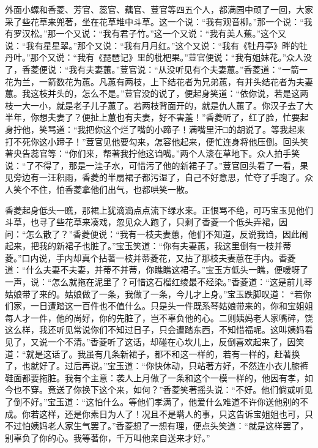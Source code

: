 \begin{parag}
    外面小螺和香菱、芳官、蕊官、藕官、荳官等四五个人，都满园中顽了一回，大家采了些花草来兜著，坐在花草堆中斗草。这一个说：“我有观音柳。”那一个说：“我有罗汉松。”那一个又说：“我有君子竹。”这一个又说：“我有美人蕉。”这个又说：“我有星星翠。”那个又说：“我有月月红。”这个又说：“我有《牡丹亭》畔的牡丹叶。”那个又说：“我有《琵琶记》里的枇杷果。”荳官便说：“我有姐妹花。”众人没了，香菱便说：“我有夫妻蕙。”荳官说：“从没听见有个夫妻蕙。”香菱道：“一箭一花为兰，一箭数花为蕙。凡蕙有两枝，上下结花者为兄弟蕙，有并头结花者为夫妻蕙。我这枝并头的，怎么不是。”荳官没的说了，便起身笑道：“依你说，若是这两枝一大一小，就是老子儿子蕙了。若两枝背面开的，就是仇人蕙了。你汉子去了大半年，你想夫妻了？便扯上蕙也有夫妻，好不害羞！”香菱听了，红了脸，忙要起身拧他，笑骂道：“我把你这个烂了嘴的小蹄子！满嘴里汗□的胡说了。等我起来打不死你这小蹄子！”荳官见他要勾来，怎容他起来，便忙连身将他压倒。回头笑著央告蕊官等：“你们来，帮著我拧他这诌嘴。”两个人滚在草地下。众人拍手笑说：“了不得了，那是一洼子水，可惜污了他的新裙子了。”荳官回头看了一看，果见旁边有一汪积雨，香菱的半扇裙子都污湿了，自己不好意思，忙夺了手跑了。众人笑个不住，怕香菱拿他们出气，也都哄笑一散。
\end{parag}


\begin{parag}
    香菱起身低头一瞧，那裙上犹滴滴点点流下绿水来。正恨骂不绝，可巧宝玉见他们斗草，也寻了些花草来凑戏，忽见众人跑了，只剩了香菱一个低头弄裙，因问：“怎么散了？”香菱便说：“我有一枝夫妻蕙，他们不知道，反说我诌，因此闹起来，把我的新裙子也脏了。”宝玉笑道：“你有夫妻蕙，我这里倒有一枝并蒂菱。”口内说，手内却真个拈著一枝并蒂菱花，又拈了那枝夫妻蕙在手内。香菱道：“什么夫妻不夫妻，并蒂不并蒂，你瞧瞧这裙子。”宝玉方低头一瞧，便嗳呀了一声，说：“怎么就拖在泥里了？可惜这石榴红绫最不经染。”香菱道：“这是前儿琴姑娘带了来的。姑娘做了一条，我做了一条，今儿才上身。”宝玉跌脚叹道： “若你们家，一日遭踏这一百件也不值什么。只是头一件既系琴姑娘带来的，你和宝姐姐每人才一件，他的尚好，你的先脏了，岂不辜负他的心。二则姨妈老人家嘴碎，饶这么样，我还听见常说你们不知过日子，只会遭踏东西，不知惜福呢。这叫姨妈看见了，又说一个不清。”香菱听了这话，却碰在心坎儿上，反倒喜欢起来了，因笑道：“就是这话了。我虽有几条新裙子，都不和这一样的，若有一样的，赶著换了，也就好了。过后再说。”宝玉道：“你快休动，只站著方好，不然连小衣儿膝裤鞋面都要拖脏。我有个主意：袭人上月做了一条和这个一模一样的，他因有孝，如今也不穿。竟送了你换下这个来，如何？”香菱笑著摇头说：“不好。他们倘或听见了倒不好。”宝玉道：“这怕什么。等他们孝满了，他爱什么难道不许你送他别的不成。你若这样，还是你素日为人了！况且不是瞒人的事，只这告诉宝姐姐也可，只不过怕姨妈老人家生气罢了。”香菱想了一想有理，便点头笑道：“就是这样罢了，别辜负了你的心。我等著你，千万叫他亲自送来才好。”
\end{parag}


